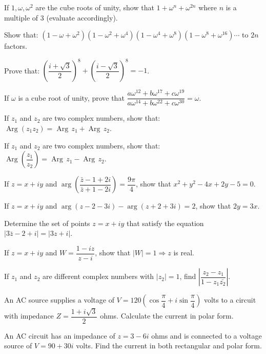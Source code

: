 \documentclass[11pt,a4paper]{article}
\begin{document}
\begin{longlist}
\item If $1,\omega,\omega^2$ are the cube roots of unity, show that $1+\omega^n+\omega^{2n}$ where $n$ is a multiple of 3 (evaluate accordingly).

\item Show that: $(1-\omega+\omega^2)(1-\omega^2+\omega^4)(1-\omega^4+\omega^8)(1-\omega^8+\omega^{16})\cdots$ to $2n$ factors.

\item Prove that: $\left(\dfrac{i+\sqrt{3}}{2}\right)^8+\left(\dfrac{i-\sqrt{3}}{2}\right)^8=-1$.

\item If $\omega$ is a cube root of unity, prove that $\dfrac{a\omega^{12}+b\omega^{17}+c\omega^{19}}{a\omega^{14}+b\omega^{22}+c\omega^{30}}=\omega$.

\item If $z_1$ and $z_2$ are two complex numbers, show that: $\operatorname{Arg}(z_1 z_2)=\operatorname{Arg}\,z_1+\operatorname{Arg}\,z_2$.

\item If $z_1$ and $z_2$ are two complex numbers, show that: $\operatorname{Arg}\left(\dfrac{z_1}{z_2}\right)=\operatorname{Arg}\,z_1-\operatorname{Arg}\,z_2$.

\item If $z=x+iy$ and $\arg\left(\dfrac{\bar{z}-1+2i}{\bar{z}+1-2i}\right)=\dfrac{9\pi}{4}$, show that $x^2+y^2-4x+2y-5=0$.

\item If $z=x+iy$ and $\arg(z-2-3i)-\arg(z+2+3i)=2$, show that $2y=3x$.

\item Determine the set of points $z=x+iy$ that satisfy the equation $|3\bar{z}-2+i|=|3z+i|$.

\item If $z=x+iy$ and $W=\dfrac{1-iz}{z-i}$, show that $|W|=1\Rightarrow z$ is real.

\item If $z_1$ and $z_2$ are different complex numbers with $|z_2|=1$, find $\left|\dfrac{z_2-z_1}{1-z_1\bar{z_2}}\right|$.

\item An AC source supplies a voltage of $V=120\left(\cos\dfrac{\pi}{4}+i\sin\dfrac{\pi}{4}\right)$ volts to a circuit with impedance $Z=\dfrac{1+i\sqrt{3}}{2}$ ohms. Calculate the current in polar form.

\item An AC circuit has an impedance of $z=3-6i$ ohms and is connected to a voltage source of $V=90+30i$ volts. Find the current in both rectangular and polar form.


\end{longlist}
\end{document}

